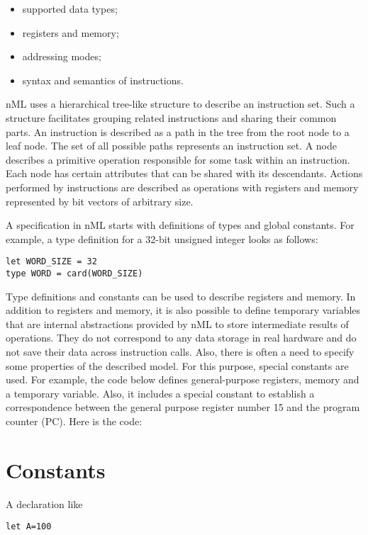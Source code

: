 \documentclass[oneside,final,14pt]{extreport}
\begin{document}
\begin{itemize}
\item supported data types;
\item registers and memory;
\item addressing modes;
\item syntax and semantics of instructions.
\end{itemize}

nML uses a hierarchical tree-like structure to describe an instruction set.
Such a structure facilitates grouping related instructions and sharing their
common parts. An instruction is described as a path in the tree from the root
node to a leaf node. The set of all possible paths represents an instruction
set. A node describes a primitive operation responsible for some task within
an instruction. Each node has certain attributes that can be shared with its
descendants. Actions performed by instructions are described as operations
with registers and memory represented by bit vectors of arbitrary size.

A specification in nML starts with definitions of types and global constants.
For example, a type definition for a 32-bit unsigned integer looks as follows:

\begin{lstlisting}
let WORD_SIZE = 32
type WORD = card(WORD_SIZE)
\end{lstlisting}

Type definitions and constants can be used to describe registers and memory.
In addition to registers and memory, it is also possible to define temporary
variables that are internal abstractions provided by nML to store intermediate
results of operations. They do not correspond to any data storage in real
hardware and do not save their data across instruction calls. Also, there is
often a need to specify some properties of the described model. For this
purpose, special constants are used. For example, the code below defines
general-purpose registers, memory and a temporary variable. Also, it includes
a special constant to establish a correspondence between the general purpose
register number 15 and the program counter (PC). Here is the code:

\section{Constants}

A declaration like

\begin{lstlisting}
let A=100
\end{lstlisting}
\end{document}
